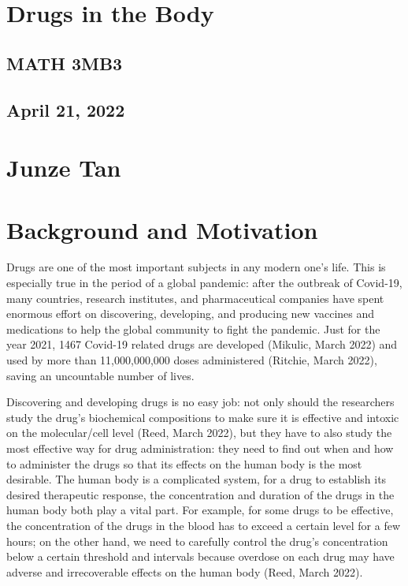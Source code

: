 \documentclass{article}
\begin{document}
\begin{center}
    \section*{Drugs in the Body}
    \subsection*{MATH 3MB3}
    \subsection*{April 21, 2022} 
    \section*{Junze Tan}
\end{center}

\section*{Background and Motivation}
Drugs are one of the most important subjects in any modern one’s life. This is especially true in the period of a global pandemic: after the outbreak of Covid-19, many countries, research institutes, and pharmaceutical companies have spent enormous effort on discovering, developing, and producing new vaccines and medications to help the global community to fight the pandemic. Just for the year 2021, 1467 Covid-19 related drugs are developed (Mikulic, March 2022) and used by more than 11,000,000,000 doses administered (Ritchie, March 2022), saving an uncountable number of lives.
 
Discovering and developing drugs is no easy job: not only should the researchers study the drug’s biochemical compositions to make sure it is effective and intoxic on the molecular/cell level (Reed, March 2022), but they have to also study the most effective way for drug administration: they need to find out when and how to administer the drugs so that its effects on the human body is the most desirable. The human body is a complicated system, for a drug to establish its desired therapeutic response, the concentration and duration of the drugs in the human body both play a vital part. For example, for some drugs to be effective, the concentration of the drugs in the blood has to exceed a certain level for a few hours; on the other hand, we need to carefully control the drug's concentration below a certain threshold and intervals because overdose on each drug may have adverse and irrecoverable effects on the human body (Reed, March 2022).
 
\end{document}
